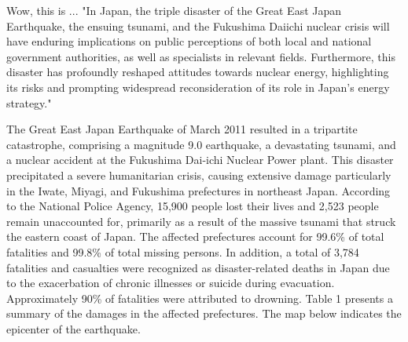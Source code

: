 \documentclass[12pt,halfline,a4paper]{ouparticle}
\begin{document}
 Wow, this is ... "In Japan, the triple disaster of the Great East Japan Earthquake, the ensuing tsunami, and the Fukushima Daiichi nuclear crisis will have enduring implications on public perceptions of both local and national government authorities, as well as specialists in relevant fields. Furthermore, this disaster has profoundly reshaped attitudes towards nuclear energy, highlighting its risks and prompting widespread reconsideration of its role in Japan's energy strategy."




The Great East Japan Earthquake of March 2011 resulted in a tripartite catastrophe, comprising a magnitude 9.0 earthquake, a devastating tsunami, and a nuclear accident at the Fukushima Dai-ichi Nuclear Power plant. This disaster precipitated a severe humanitarian crisis, causing extensive damage particularly in the Iwate, Miyagi, and Fukushima prefectures in northeast Japan. According to the National Police Agency, 15,900 people lost their lives and 2,523 people remain unaccounted for, primarily as a result of the
massive tsunami that struck the eastern coast of Japan. The affected
prefectures account for 99.6\% of total fatalities and 99.8\% of total missing persons. In addition, a total of 3,784 fatalities and casualties were recognized as disaster-related deaths in Japan due to the exacerbation of chronic illnesses or suicide during evacuation. Approximately 90\% of fatalities were attributed to drowning. Table 1 presents a summary of the damages in the affected prefectures. The map below indicates the epicenter of the earthquake.
\end{document}
